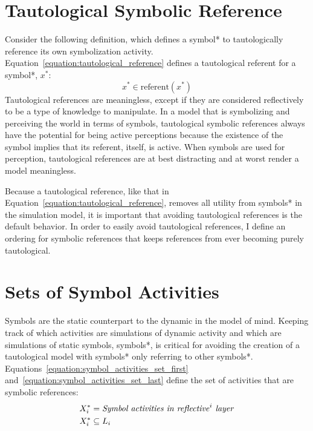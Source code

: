 \section{Tautological Symbolic Reference}

Consider the following definition, which defines a symbol* to
tautologically reference its own symbolization activity.
Equation~\ref{equation:tautological_reference} defines a tautological
referent for a symbol*, $x^*$:
\begin{equation}
\label{equation:tautological_reference}
x^* \in \text{referent}(x^*)
\end{equation}
Tautological references are meaningless, except if they are considered
reflectively to be a type of knowledge to manipulate.  In a model that
is symbolizing and perceiving the world in terms of symbols,
tautological symbolic references always have the potential for being
active perceptions because the existence of the symbol implies that
its referent, itself, is active.  When symbols are used for
perception, tautological references are at best distracting and at
worst render a model meaningless.

Because a tautological reference, like that in
Equation~\ref{equation:tautological_reference}, removes all utility
from symbols* in the simulation model, it is important that avoiding
tautological references is the default behavior.  In order to easily
avoid tautological references, I define an ordering for symbolic
references that keeps references from ever becoming purely
tautological.

\section{Sets of Symbol Activities}

Symbols are the static counterpart to the dynamic in the model of
mind.  Keeping track of which activities are simulations of dynamic
activity and which are simulations of static symbols, symbols*, is
critical for avoiding the creation of a tautological model with
symbols* only referring to other symbols*.
Equations~\ref{equation:symbol_activities_set_first}
and~\ref{equation:symbol_activities_set_last} define the set of
activities that are symbolic references:
\begin{align}
\label{equation:symbol_activities_set_first}
X^*_i &= \text{\emph{Symbol activities in reflective}}^i\text{\emph{ layer}} \\
\label{equation:symbol_activities_set_last}
X^*_i &\subseteq L_i
\end{align}

